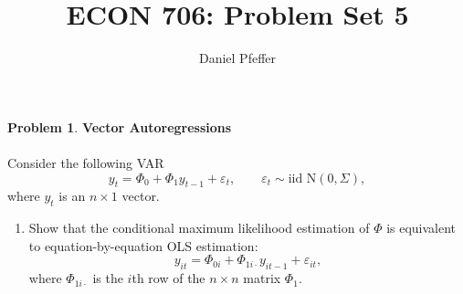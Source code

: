 \documentclass[oneside,reqno]{amsart}
\title{ECON 706: Problem Set 5}
\author{Daniel Pfeffer}
\newcommand{\eps}{\varepsilon}
\theoremstyle{definition}
\newtheorem{prob}{Problem}
\begin{document}
\maketitle

\begin{prob}
\textbf{Vector Autoregressions} 
\\ \\
Consider the following VAR
\[
	y_t = \Phi_0 + \Phi_1 y_{t-1} + \eps_t,
	\qquad 
	\eps_t \sim \text{iid N}(0, \Sigma),
\]
where $y_t$ is an $n \times 1$ vector. 
\end{prob}

\begin{enumerate}
\item
Show that the conditional maximum likelihood estimation of $\Phi$ is equivalent to equation-by-equation OLS estimation:
\[
	y_{it} = \Phi_{0i} + \Phi_{1i \cdot} y_{it-1} + \eps_{it},
\]	
where $\Phi_{1i \cdot}$ is the $i$th row of the $n\times n$ matrix $\Phi_1$.


\end{enumerate}
\end{document}
